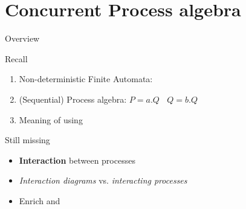 \documentclass[aspectratio=169]{beamer}
\begin{document}


\section{Concurrent Process algebra}


\begin{slide}{Overview}

\begin{block}{Recall}
\begin{enumerate}
  \item Non-deterministic Finite Automata:
  \item (Sequential) Process algebra:
    $P = a.Q ~~~~ Q=b.Q$

  \item Meaning of  using 
\end{enumerate}  
\end{block}

\begin{block}{Still missing}
\begin{itemize}
  \item \alert{\textbf{Interaction}} between processes
  \item \emph{Interaction \alert{diagrams}} vs. \emph{interacting \alert{processes}}
  \item Enrich  and 
\end{itemize}
\end{block}

\end{slide}
\end{document}
